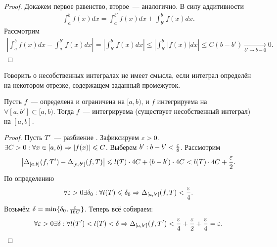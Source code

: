 \documentclass[../main.tex]{subfiles}
\begin{document}
\begin{proof}
    Докажем первое равенство, второе~--- аналогично. В силу аддитивности 
    \begin{gather} 
      \int_{a}^{b} f(x)dx = \int_{a}^{b'} f(x) dx + \int_{b'}^{b} f(x)dx.
    \end{gather}
    Рассмотрим 
    \begin{gather} 
      \left| \int_{a}^{b} f(x) dx - \int_{a}^{b'} f(x) dx \right| = \left| \int_{b'}^{b} f(x)dx \right| \leq \left| \int_{b'}^{b} \left| f(x) \right| dx \right| \leq C (b-b')  \xrightarrow[b' \to  b-0 ]{} 0 .
    \end{gather}
\end{proof}

\begin{note}
    Говорить о несобственных интегралах не имеет смысла, если интеграл определён на некотором отрезке, содержащем заданный промежуток.
\end{note}

\begin{proposition}
    Пусть $f$~--- определена и ограничена на $[a,b)$, и $f$ интегрируема на $\forall [a, b'] \subset [a, b)$. Тогда $f$~--- интегрируема (существует несобственный интеграл) на $[a, b]$.
\end{proposition}

\begin{proof}
    Пусть $T'$~--- разбиение \segab. Зафиксируем $\varepsilon>0$. $\exists C>0: \forall x \in [a, b) \Rightarrow \left| f(x) \right| \leqslant C$. Выберем $b': b-b' < \frac{\varepsilon}{8}$. Рассмотрим
    \begin{gather} 
      \left| \Delta_{[a,b]} (f, T') - \Delta_{[a,b']}(f, T) \right| \leqslant l(T) \cdot 4C + (b-b') \cdot 4C < l(T) \cdot 4C + \frac{\varepsilon}{2} .
    \end{gather}
    По определению 
    \begin{gather} 
      \forall \varepsilon > 0 \exists \delta_0 : \forall l(T) \leqslant \delta_0 \Rightarrow \Delta_{[a,b']} (f, T) < \frac{\varepsilon}{4} .
    \end{gather}
    Возьмём $\delta = \min\{\delta_0, \frac{\varepsilon}{16C}\}$. Теперь всё собираем: 
    \begin{gather} 
      \forall \varepsilon > 0 \exists \delta : \forall l(T') < l(T) < \delta \Rightarrow \Delta_{[a,b']}(f, T') < \frac{\varepsilon}{4} + \frac{\varepsilon}{2} + \frac{\varepsilon}{4} = \varepsilon.
    \end{gather} 
\end{proof}
\end{document}
